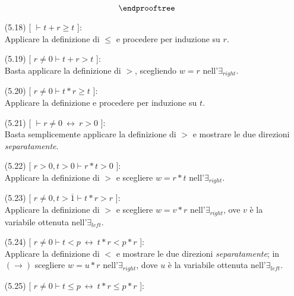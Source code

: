 \begin{enumerate}
$$	\endprooftree$$		
	\vspace{.5cm}
	\item[(5.18)] [ $\vdash t+r\geq t$ ]:
	\vspace{.2cm}
	\\Applicare la definizione di $\leq$ e procedere per induzione su $r$.
	\vspace{.5cm}
	\item[(5.19)] [ $r\neq 0\vdash t+r>t$  ]:
	\vspace{.2cm}
	\\Basta applicare la definizione di $>$, scegliendo $w=r$ nell'$\exists_{right}$.
	\vspace{.5cm}
	\item[(5.20)] [ $r\neq 0\vdash t*r\geq t$ ]:
	\vspace{.2cm}
	\\Applicare la definizione e procedere per induzione su $t$.
	\vspace{.5cm}
	\item[(5.21)] [ $\vdash r\neq 0\ \leftrightarrow\ r>0$ ]:
	\vspace{.2cm}
	\\Basta semplicemente applicare la definizione di $>$ e mostrare le due direzioni \textsl{separatamente}.
	\vspace{.5cm}
	\item[(5.22)] [ $r>0,t>0\vdash r*t>0$ ]:
	\vspace{.2cm}
	\\Applicare la definizione di $>$ e scegliere $w=r*t$ nell'$\exists_{right}$.
	\vspace{.5cm}
	\item[(5.23)] [ $r\neq 0,t>\overline{1}\vdash t*r>r$ ]:
	\vspace{.2cm}
	\\Applicare la definizione di $>$ e scegliere $w=v*r$ nell'$\exists_{right}$, ove $v$ \`e la variabile ottenuta nell'$\exists_{left}$.
	\vspace{.5cm}
	\item[(5.24)] [ $r\neq 0\vdash t<p\ \leftrightarrow\ t*r<p*r$ ]:
	\vspace{.2cm}
	\\Applicare la definizione di $<$ e mostrare le due direzioni \textsl{separatamente}; in $(\rightarrow)$ scegliere $w=u*r$ nell'$\exists_{right}$, dove $u$ \`e la variabile ottenuta nell'$\exists_{left}$.
	\vspace{.5cm}
	\item[(5.25)] [ $r\neq 0\vdash t\leq p\ \leftrightarrow\ t*r\leq p*r$ ]:

\end{enumerate}
